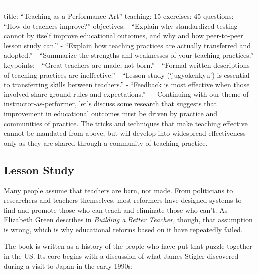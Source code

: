 \begin{center}
\rule{3in}{0.4pt}
\end{center}
title: ``Teaching as a Performance Art''
teaching: 15
exercises: 45
questions:
- ``How do teachers improve?''
objectives:
- ``Explain why standardized testing cannot by itself improve educational outcomes, and why and how peer-to-peer lesson study can.''
- ``Explain how teaching practices are actually transferred and adopted.''
- ``Summarize the strengths and weaknesses of your teaching practices.''
keypoints:
- ``Great teachers are made, not born.''
- ``Formal written descriptions of teaching practices are ineffective.''
- ``Lesson study (`jugyokenkyu') is essential to transferring skills between teachers.''
- ``Feedback is most effective when those involved share ground rules and expectations.''
---
Continuing with our theme of instructor-as-performer,
let's discuss some research that suggests that improvement in educational outcomes
must be driven by practice and communities of practice.
The tricks and techniques that make teaching effective cannot be mandated from above,
but will develop into widespread effectiveness
only as they are shared through a community of teaching practice.

\subsection*{Lesson Study}

Many people assume that teachers are born, not made.
From politicians to researchers and teachers themselves,
most reformers have designed systems to find and promote those who can teach
and eliminate those who can't.
As Elizabeth Green describes in
\emph{\href{http://www.amazon.com/Building-Better-Teacher-Teaching-Everyone/dp/0393081591/}{Building a Better Teacher}},
though,
that assumption is wrong,
which is why educational reforms based on it have repeatedly failed.

The book is written as a history of the people who have put that puzzle together in the US.
Its core begins with a discussion of what James Stigler discovered during a visit to Japan in the early 1990s:

